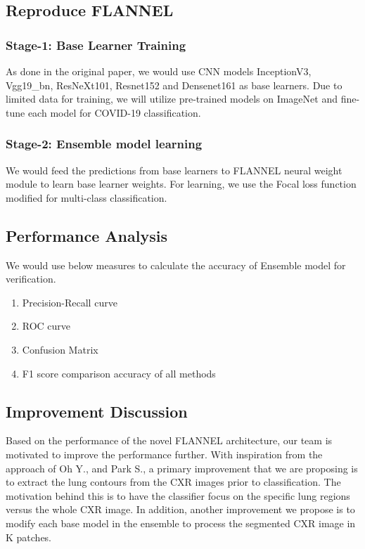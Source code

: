 \documentclass{sigkddExp}
\begin{document}
\subsection{Reproduce FLANNEL}

\subsubsection{Stage-1: Base Learner Training}

As done in the original paper, we would use CNN models InceptionV3, Vgg19\_bn,
ResNeXt101, Resnet152 and Densenet161 as base learners. Due to limited data for
training, we will utilize pre-trained models on ImageNet and fine-tune each
model for COVID-19 classification.

\subsubsection{Stage-2: Ensemble model learning}
We would feed the predictions from base learners to FLANNEL neural weight module
to learn base learner weights. For learning, we use the Focal loss function modified
for multi-class classification.

\subsection{Performance Analysis}
We would use below measures to calculate the accuracy of Ensemble model for verification.

\begin{enumerate}
    \item Precision-Recall curve
    \item ROC curve
    \item Confusion Matrix
    \item F1 score comparison accuracy of all methods
\end{enumerate}



\subsection{Improvement Discussion}

Based on the performance of the novel FLANNEL architecture, our team is
motivated to improve the performance further. With inspiration from the approach
of Oh Y., and Park S., a primary improvement that we are proposing is to extract
the lung contours from the CXR images prior to classification. The motivation
behind this is to have the classifier focus on the specific lung regions versus
the whole CXR image. In addition, another improvement we propose is to modify
each base model in the ensemble to process the segmented CXR image in K patches.
\end{document}
